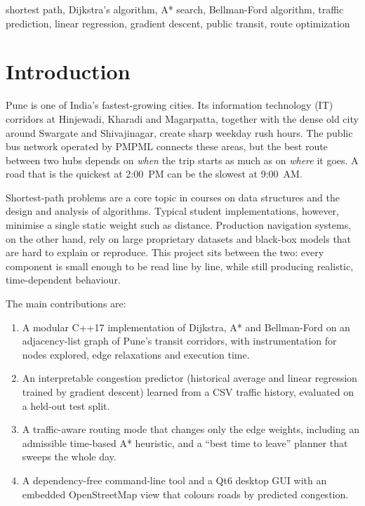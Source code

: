 \documentclass[conference]{IEEEtran}
\begin{document}
\begin{IEEEkeywords}
shortest path, Dijkstra's algorithm, A* search, Bellman-Ford algorithm,
traffic prediction, linear regression, gradient descent, public transit,
route optimization
\end{IEEEkeywords}

\section{Introduction}

Pune is one of India's fastest-growing cities. Its information
technology (IT) corridors at Hinjewadi, Kharadi and Magarpatta, together
with the dense old city around Swargate and Shivajinagar, create sharp
weekday rush hours. The public bus network operated by PMPML connects
these areas, but the best route between two hubs depends on \emph{when}
the trip starts as much as on \emph{where} it goes. A road that is the
quickest at 2:00~PM can be the slowest at 9:00~AM.

Shortest-path problems are a core topic in courses on data structures
and the design and analysis of algorithms. Typical student
implementations, however, minimise a single static weight such as
distance. Production navigation systems, on the other hand, rely on
large proprietary datasets and black-box models that are hard to explain
or reproduce. This project sits between the two: every component is
small enough to be read line by line, while still producing realistic,
time-dependent behaviour.

The main contributions are:
\begin{enumerate}
  \item A modular C++17 implementation of Dijkstra, A* and Bellman-Ford
        on an adjacency-list graph of Pune's transit corridors, with
        instrumentation for nodes explored, edge relaxations and
        execution time.
  \item An interpretable congestion predictor (historical average and
        linear regression trained by gradient descent) learned from a
        CSV traffic history, evaluated on a held-out test split.
  \item A traffic-aware routing mode that changes only the edge weights,
        including an admissible time-based A* heuristic, and a
        ``best time to leave'' planner that sweeps the whole day.
  \item A dependency-free command-line tool and a Qt6 desktop GUI with
        an embedded OpenStreetMap view that colours roads by predicted
        congestion.
\end{enumerate}
\end{document}
